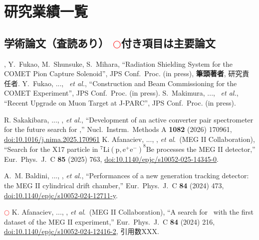 
\section{研究業績一覧}
	
\subsection{学術論文（査読あり） \textcolor{red}{$\bigcirc$}付き項目は主要論文}

	\begin{enumerate}
			\setlength{\itemsep}{-1pt}

        \me, Y.~Fukao, M.~Shunsuke, S.~Mihara, 
        ``Radiation Shielding System for the COMET Pion Capture Solenoid'', 
        JPS Conf.\ Proc. (in press), \textbf{ 筆頭著者}, 研究責任者.
         Y.~Fukao, ..., \me\ \textit{et al.}, 
        ``Construction and Beam Commissioning for the COMET Experiment'', 
        JPS Conf.\ Proc. (in press).
         S.~Makimura, ..., \me\ \textit{et al.}, 
        ``Recent Upgrade on Muon Target at J-PARC'', 
        JPS Conf.\ Proc. (in press).

R. Sakakibara, ..., \me, {\it et al.},
``Development of an active converter pair spectrometer for the future search for \megc,'' Nucl.\ Instrm.\ Methods A {\bf 1082} (2026) 170961,
\href{https://doi.org/10.1016/j.nima.2025.170961}{doi:10.1016/j.nima.2025.170961}
K. Afanaciev, ..., \me, {\it et al}.\ (MEG II Collaboration),
  ``Search for the X17 particle in $^{7}\textrm{Li}(\textrm{p},\textrm{e}^+ \textrm{e}^{-}) ^{8}\textrm{Be}$ processes  the MEG II detector,''
  Eur.\ Phys.\ J.\ C {\bf 85}  (2025) 763,
  \href{https://doi.org/10.1140/epjc/s10052-025-14345-0}{doi:10.1140/epjc/s10052-025-14345-0}.

A.~M. Baldini, ..., \me, {\it et al.},
``Performances of a new generation tracking detector: the MEG II cylindrical drift chamber,''
  Eur.\ Phys.\ J.\ C {\bf 84}  (2024) 473,
\href{https://doi.org/10.1140/epjc/s10052-024-12711-y}{doi:10.1140/epjc/s10052-024-12711-y}.

\textcolor{red}{$\bigcirc$} 
K. Afanaciev, ..., \me, {\it et al}.\ (MEG II Collaboration),
  ``A search for \megc\ with the first dataset of the MEG II experiment,''
  Eur.\ Phys.\ J.\ C {\bf 84}  (2024) 216,
  \href{https://doi.org/10.1140/epjc/s10052-024-12416-2}{doi:10.1140/epjc/s10052-024-12416-2},
  引用数XXX.


\end{enumerate}

